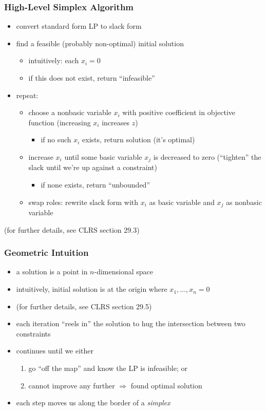\documentclass{beamer}
\begin{document}
\begin{frame} \frametitle{High-Level Simplex Algorithm}
  \begin{itemize}
    \item convert standard form LP to slack form
    \item find a feasible (probably non-optimal) initial solution
      \begin{itemize}
        \item intuitively: each $x_i=0$
      \item if this does not exist, return ``infeasible''
    \end{itemize}
    \item repeat:
    \begin{itemize}
      \item choose a nonbasic variable $x_i$ with positive coefficient in objective
        function (increasing $x_i$ increases $z$)
        \begin{itemize}
          \item if no such $x_i$ exists, return solution (it's optimal)
        \end{itemize}
      \item increase $x_i$ until some basic variable $x_j$ is decreased to zero
        (``tighten'' the slack until we're up against a constraint)
        \begin{itemize}
          \item if none exists, return ``unbounded''
        \end{itemize}
      \item swap roles: rewrite slack form with $x_i$ as basic variable and
        $x_j$ as nonbasic variable
    \end{itemize}
  \end{itemize}
  (for further details, see CLRS section 29.3)
\end{frame}

\begin{frame} \frametitle{Geometric Intuition}
\begin{itemize}
  \item a solution is a point in $n$-dimensional space
  \item intuitively, initial solution is at the origin where $x_1, \ldots, x_n = 0$
  \item (for further details, see CLRS section 29.5)
  \item each iteration ``reels in'' the solution to hug the intersection between
    two constraints
  \item continues until we either
  \begin{enumerate}
    \item go ``off the map'' and know the LP is infeasible; or
    \item cannot improve any further $\Rightarrow$ found optimal solution
  \end{enumerate}
  \item each step moves us along the border of a \emph{simplex}
\end{itemize}
\end{frame}
\end{document}
